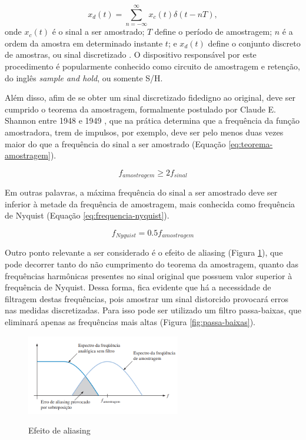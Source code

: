 \documentclass[oneside,openright,12pt]{ufsm_2015} %
\begin{document}
\begin{equation}\label{eq:amostragem}
    x_{d}(t) = \sum\limits_{n = -\infty}^\infty x_{c}(t)\delta(t-nT),
\end{equation}
onde $x_{c}(t)$ é o sinal a ser amostrado; $T$ define o período de amostragem;  $n$ é a ordem da amostra em determinado instante $t$; e $x_{d}(t)$ define o conjunto discreto de amostras, ou sinal discretizado \cite{livro:discrete-time-signal-processing}. O dispositivo responsável por este procedimento é popularmente conhecido como circuito de amostragem e retenção, do inglês \textit{sample and hold}, ou somente S/H.

Além disso, afim de se obter um sinal discretizado fidedigno ao original, deve ser cumprido o teorema da amostragem, formalmente postulado por Claude E. Shannon entre 1948 e 1949 \cite{luke1999origins}, que na prática determina que a frequência da função amostradora, trem de impulsos, por exemplo, deve ser pelo menos duas vezes maior do que a frequência do sinal a ser amostrado (Equação \ref{eq:teorema-amostragem}). 

\begin{equation}\label{eq:teorema-amostragem}
    f_{amostragem} \geq 2f_{sinal}
\end{equation}

Em outras palavras, a máxima frequência do sinal a ser amostrado deve ser inferior à metade da frequência de amostragem, mais conhecida como frequência de Nyquist (Equação \ref{eq:frequencia-nyquist}).

\begin{equation}\label{eq:frequencia-nyquist}
    f_{Nyquist} = 0.5f_{amostragem}
\end{equation}

Outro ponto relevante a ser considerado é o efeito de aliasing (Figura \ref{fig:efeito-aliasing}), que pode decorrer tanto do não cumprimento do teorema da amostragem, quanto das frequências harmônicas presentes no sinal original que possuem valor superior à frequência de Nyquist. Dessa forma, fica evidente que há a necessidade de filtragem destas frequências, pois amostrar um sinal distorcido provocará erros nas medidas discretizadas. Para isso pode ser utilizado um filtro passa-baixas, que eliminará apenas as frequências mais altas (Figura \ref{fig:passa-baixas}).

\begin{figure}[ht]
    \caption{\label{exepretex} Efeito de aliasing}
    \centering
    \includegraphics[width=0.6\textwidth]{figuras/aliasing.png}
    \vspace{\baselineskip} %
        \label{fig:efeito-aliasing}
\end{figure}
\end{document}

